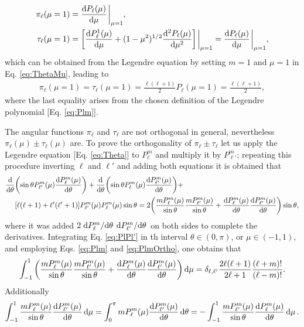 %
\begin{align}
\pi_\ell(\mu=1) & =  \dv{P_\ell(\mu)}{\mu}\eval_{\mu=1},\\
\tau_\ell (\mu = 1) & = \qty[\dv{P_\ell^1(\mu)}{\mu} + (1-\mu^2)^{1/2}\dv[2]{P_\ell(\mu)}{\mu}]\eval_{\mu=1} = \dv{P_\ell(\mu)}{\mu}\eval_{\mu=1},
\end{align}
%
which can be obtained from the Legendre equation  by setting $m = 1$ and $\mu = 1$ in Eq. \eqref{eq:ThetaMu}, leading to
%
\begin{align}
\pi_\ell(\mu=1) = \tau_\ell(\mu=1) = \frac{\ell(\ell+1)}{2} P_\ell(\mu = 1) = \frac{\ell(\ell+1)}{2},
\end{align}
%
where the last equality arises from the chosen definition of the Legendre polynomial [Eq. \eqref{eq:Plm}].

The angular functions $\pi_\ell$  and $\tau_\ell$ are not orthogonal in general, nevertheless  $\pi_\ell(\mu)\pm\tau_\ell(\mu)$ are. To prove the orthogonality of $\pi_\ell\pm\tau_\ell$ let us apply the Legendre equation [Eq. \eqref{eq:Theta}] to $P_\ell^m$ and multiply it by $P_{\ell'}^m$; repeating this procedure inverting $\ell$ and $\ell'$ and adding both equations it is obtained that
%
\begin{align}
\dv{\theta}&\qty(\sin\theta P_{\ell'}^m(\mu)\dv{P_\ell^m(\mu)}{\theta}) +
\dv{\theta}\qty(\sin\theta P_{\ell}^m(\mu)\dv{P_{\ell'}^m(\mu)}{\theta}) +  
\label{eq:PlPl'}
\\
&\qty[\ell(\ell+1)+\ell'(\ell'+1)]P_{\ell'}^m(\mu)P_{\ell}^m(\mu) \sin\theta
=
 2\qty(\frac{mP_\ell^m(\mu)}{\sin\theta}\frac{mP_{\ell'}^m(\mu)}{\sin\theta}+ \dv{P_\ell^m(\mu)}{\theta}\dv{P_{\ell'}^m(\mu)}{\theta})\sin\theta,\notag
\end{align}
%
where  it was added $2\dv*{P_\ell^m}{\theta}\dv*{P_{\ell'}^m}{\theta}$ on both sides to complete the derivatives. Integrating Eq. \eqref{eq:PlPl'} in th interval $\theta \in (0,\pi)$, or $\mu \in(-1,1)$, and employing Eqs. \eqref{eq:Plm} and \eqref{eq:PlmOrtho}, one obtains that
%
\begin{align}
\int_{-1}^1 \qty(\frac{mP_\ell^m(\mu)}{\sin\theta}\frac{mP_{\ell'}^m(\mu)}{\sin\theta}+ \dv{P_\ell^m(\mu)}{\theta}\dv{P_{\ell'}^m(\mu)}{\theta})\dd{\mu} = 
\delta_{\ell,\ell'}\frac{2\ell(\ell+1)}{2\ell+1}\frac{(\ell+m)!}{(\ell-m)!}.
\label{eq:PimlTauml}
\end{align}
%
Additionally 
%
\begin{align}
\int_{-1}^1\frac{mP_\ell^m(\mu)}{\sin\theta}\dv{P_{\ell'}^m(\mu)}{\theta}\dd{\mu}
 = \int_0^{\pi} mP_\ell^m(\mu)\dv{P_{\ell'}^m(\mu)}{\theta}\dd{\theta} = 
 -\int_{-1}^1\frac{mP_{\ell'}^m(\mu)}{\sin\theta}\dv{P_{\ell}^m(\mu)}{\theta}\dd{\mu}.
 \label{eq:taupiCross}
\end{align}

